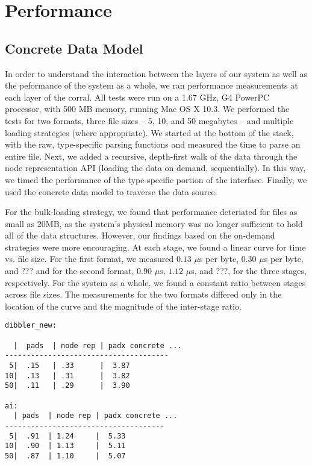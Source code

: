 \section{Performance}
\label{section:performance}

\subsection{Concrete Data Model} 
In order to understand the interaction between the layers of our
system as well as the peformance of the system as a whole, we ran
performance measurements at each layer of the corral. All tests were
run on a 1.67 GHz, G4 PowerPC processor, with 500 MB memory, running
Mac OS X 10.3. We performed the tests for two formats, three file
sizes -- 5, 10, and 50 megabytes -- and multiple loading strategies
(where appropriate). We started at the bottom of the stack, with the
raw, type-specific parsing functions and measured the time to parse an
entire file. Next, we added a recursive, depth-first walk of the data
through the \padx node representation API (loading the data on demand,
sequentially). In this way, we timed the performance of the
type-specific portion of the \xml{} interface.  Finally, we used the
\padx{} concrete data model to traverse the data source.

For the bulk-loading strategy, we found that performance deteriated
for files as small as 20MB, as the system's physical memory was no
longer sufficient to hold all of the data structures. However, our
findings based on the on-demand strategies were more encouraging. At
each stage, we found a linear curve for time vs. file size. For the
first format, we measured $0.13$ {$\mu$}s per byte, $0.30$ {$\mu$}s per
byte, and ??? and for the second format, $0.90$ {$\mu$}s, $1.12$ {$\mu$}s,
and ???, for the three stages, respectively. For the system as a
whole, we found a constant ratio between stages across file sizes. The
measurements for the two formats differed only in the location of the
curve and the magnitude of the inter-stage ratio.

\begin{verbatim}
dibbler_new:

  |  pads  | node rep | padx concrete ...
--------------------------------------
 5|  .15   | .33      |  3.87
10|  .13   | .31      |  3.82
50|  .11   | .29      |  3.90

ai:
  | pads  | node rep | padx concrete ...
-------------------------------------
 5|  .91  | 1.24     |  5.33
10|  .90  | 1.13     |  5.11
50|  .87  | 1.10     |  5.07
\end{verbatim}

